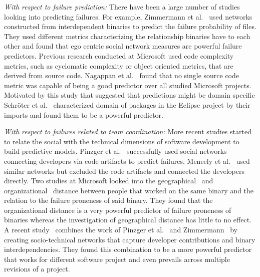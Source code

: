 \emph{With respect to failure prediction:}
There have been a large number of studies looking into predicting failures. For
example, Zimmermann et al.~\cite{zimmermann:icse:2008} used
networks constructed from interdependent binaries to predict the failure
probability of files. They used different metrics characterizing the relationship
binaries have to each other and found that ego centric social network measures
are powerful failure predictors. Previous research conducted at Microsoft used
code complexity metrics, such as cyclomatic complexity or object oriented
metrics, that are derived from source code. Nagappan et
al.~\cite{nagappan:icse:2006} found
that no single source code metric was capable of being a good
predictor over all studied Microsoft projects. Motivated by this study that
suggested that predictions might be domain specific Schr\"oter et
al.~\cite{schroeter:isese:2006} characterized domain of packages in the Eclipse
project by their imports and found them to be a powerful predictor.


\emph{With respect to failures related to team coordination:}
More recent studies started to relate the social with the technical
dimensions of software development to build predictive models. Pinzger et
al.~\cite{pinzger:fse:2008} successfully used social networks connecting
developers via code artifacts to predict failures. Meneely et
al.~\cite{meneely:fse:2008} used similar networks but excluded the code artifacts
and connected the developers directly. Two studies at Microsoft looked into the
geographical~\cite{bird:acm:2009} and organizational~\cite{nagappan:icse:2008}
distance between people that worked on the same binary and the relation to the
failure proneness of said binary. They found that the organizational distance is
a very powerful predictor of failure proneness of binaries whereas the
investigation of geographical distance has little to no effect. A recent
study~\cite{bird:issre:2009} combines the work of Pinzger et
al.~\cite{pinzger:fse:2008} and
Zimmermann~\cite{zimmermann:icse:2008} by creating
socio-technical networks that capture developer contributions and binary
interdependencies. They found this combination to be a more powerful predictor
that works for different software project and even prevails across multiple
revisions of a project.


